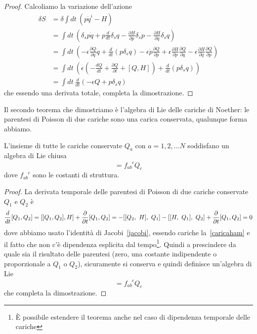     \begin{proof}
        Calcoliamo la variazione dell'azione
    \begin{equation*}
    \begin{aligned}
        \delta S & = \delta \int dt ~ (p \dot q^i - H) \\ & = \int dt ~  (\delta_s p \dot q + p \frac{d}{dt} \delta_s q - \frac{\partial H}{\partial p} \delta_s p - \frac{\partial H}{\partial q} \delta_s q) \\ & = \int dt ~ (- \epsilon \frac{\partial Q}{\partial q} \dot q + \frac{d}{dt} (p \delta_s q) - \epsilon \dot p \frac{\partial Q}{\partial p} + \epsilon \frac{\partial H}{\partial p} \frac{\partial Q}{\partial q} - \epsilon \frac{\partial H}{\partial q}\frac{\partial Q}{\partial p}) \\ & = \int dt ~ (\epsilon (- \frac{dQ}{dt} + \frac{\partial Q}{\partial t} + [Q, H] ) + \frac{d}{dt} (p \delta_s q)) \\ & = \int dt ~ \frac{d}{dt}(-\epsilon Q + p \delta_s q)
    \end{aligned}
    \end{equation*}
        che essendo una derivata totale, completa la dimostrazione.
    \end{proof}

    Il secondo teorema che dimostriamo è l'algebra di Lie delle cariche di Noether: le parentesi di Poisson di due cariche sono una carica conservata, qualunque forma abbiamo.

    \begin{theorem}
        L'insieme di tutte le cariche conservate $Q_a$ con $a = 1, 2, \ldots N$ soddisfano un algebra di Lie chiusa
    \begin{equation*}
        [Q_a, Q_b] = f_{ab}^{\phantom{ab}c} Q_c
    \end{equation*}
        dove $f_{ab}^{\phantom{ab}c}$ sono le costanti di struttura.
    \end{theorem}

    \begin{proof}
        La derivata temporale delle parentesi di Poisson di due cariche conservate $Q_1$ e $Q_2$ è
    \begin{equation*}
        \frac{d}{dt} [Q_1, Q_2] = [[Q_1, Q_2], H] + \frac{\partial}{\partial t} [Q_1, Q_2] = - [[Q_2, ~H], ~Q_1] - [[H, ~Q_1], ~Q_2] + \frac{\partial}{\partial t} [Q_1, Q_2] = 0
    \end{equation*} 
        dove abbiamo usato l'identità di Jacobi~\eqref{jacobi}, essendo cariche la~\eqref{caricaham} e il fatto che non c'è dipendenza esplicita dal tempo\footnote{È possibile estendere il teorema anche nel caso di dipendenza temporale delle cariche}. Quindi a prescindere da quale sia il risultato delle parentesi (zero, una costante indipendente o proporzionale a $Q_1$ o $Q_2$), sicuramente si conserva e quindi definisce un'algebra di Lie
    \begin{equation*}
        [Q_a, Q_b] = f_{ab}^{\phantom{ab}c} Q_c
    \end{equation*}
        che completa la dimostrazione.
    \end{proof}

